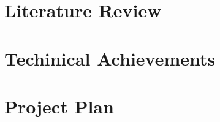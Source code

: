 \documentclass[12pt,two side]{report}
\begin{document}
\chapter{Literature Review}



\chapter{Techinical Achievements}


\chapter{Project Plan}




\end{document}

